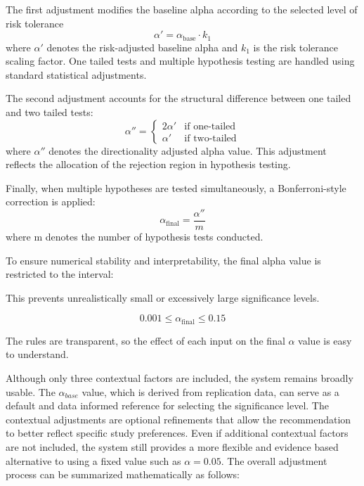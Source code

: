 The first adjustment modifies the baseline alpha according to the selected level of risk tolerance
\begin{equation}
	\alpha' 
	= 
	\alpha_{\text{base}} \cdot k_1
\end{equation}
where $\alpha'$ denotes the risk-adjusted baseline alpha and 
$k_1$ is the risk tolerance scaling factor.
One tailed tests and multiple hypothesis testing are handled using standard statistical adjustments.
 
The second adjustment accounts for the structural difference between one tailed and two tailed tests\cite{Hales2023}:
 \begin{equation}
 	\alpha'' =
 	\begin{cases}
 		2\alpha' & \text{if one-tailed} \\
 		\alpha'  & \text{if two-tailed}
 	\end{cases}
 \end{equation}
 where $\alpha''$ denotes the directionality adjusted alpha value.
This adjustment reflects the allocation of the rejection region in hypothesis testing.

Finally, when multiple hypotheses are tested simultaneously, a Bonferroni-style correction is applied\cite{Herzog2019}:
\begin{equation}
	\alpha_{\text{final}} 
	= 
	\frac{\alpha''}{m}
\end{equation}
where m denotes the number of hypothesis tests conducted.

To ensure numerical stability and interpretability, the final alpha value is restricted to the interval:

This prevents unrealistically small or excessively large significance levels.

\begin{equation}
	0.001 \leq \alpha_{\text{final}} \leq 0.15
	\label{eq.alpharange}
\end{equation}

The rules are transparent, so the effect of each input on the final $\alpha$ value is easy to understand.

Although only three contextual factors are included, the system remains broadly usable. The $\alpha_{base}$ value, which is derived from replication data, can serve as a default and data informed reference for selecting the significance level. The contextual adjustments are optional refinements that allow the recommendation to better reflect specific study preferences. Even if additional contextual factors are not included, the system still provides a more flexible and evidence based alternative to using a fixed value such as $\alpha = 0.05$.
The overall adjustment process can be summarized mathematically as follows:

